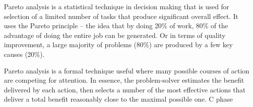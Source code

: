 Pareto analysis is a statistical technique in decision making that is used for selection of a limited number of tasks that
produce significant overall effect. It uses the Pareto principle – the idea that by doing 20\% of work, 80\% of the advantage
of doing the entire job can be generated.  Or in terms of quality improvement, a large majority of problems (80\%) are produced by a few key causes (20\%).
 
Pareto analysis is a formal technique useful where many possible courses of action are competing for attention.
In essence, the problem-solver estimates the benefit delivered by each action, then selects a number of the most
effective actions that deliver a total benefit reasonably close to the maximal possible one.
C phase

